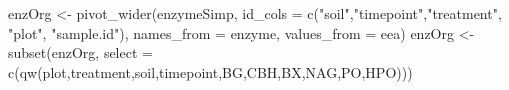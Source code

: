 \documentclass[
]{article}
\newenvironment{Shaded}{\begin{snugshade}}{\end{snugshade}}
\newcommand{\AttributeTok}[1]{\textcolor[rgb]{0.77,0.63,0.00}{#1}}
\newcommand{\FunctionTok}[1]{\textcolor[rgb]{0.00,0.00,0.00}{#1}}
\newcommand{\NormalTok}[1]{#1}
\newcommand{\OtherTok}[1]{\textcolor[rgb]{0.56,0.35,0.01}{#1}}
\newcommand{\SpecialCharTok}[1]{\textcolor[rgb]{0.00,0.00,0.00}{#1}}
\newcommand{\StringTok}[1]{\textcolor[rgb]{0.31,0.60,0.02}{#1}}
\begin{document}
\begin{Shaded}
\end{Shaded}

\begin{Shaded}
\begin{Highlighting}[]
\NormalTok{enzOrg }\OtherTok{\textless{}{-}} \FunctionTok{pivot\_wider}\NormalTok{(enzymeSimp, }\AttributeTok{id\_cols =} \FunctionTok{c}\NormalTok{(}\StringTok{"soil"}\NormalTok{,}\StringTok{"timepoint"}\NormalTok{,}\StringTok{"treatment"}\NormalTok{, }\StringTok{"plot"}\NormalTok{, }\StringTok{"sample.id"}\NormalTok{), }\AttributeTok{names\_from =}\NormalTok{ enzyme, }\AttributeTok{values\_from =}\NormalTok{ eea)}
\NormalTok{enzOrg }\OtherTok{\textless{}{-}} \FunctionTok{subset}\NormalTok{(enzOrg, }\AttributeTok{select =} \FunctionTok{c}\NormalTok{(}\FunctionTok{qw}\NormalTok{(plot,treatment,soil,timepoint,BG,CBH,BX,NAG,PO,HPO)))}
\end{Highlighting}
\end{Shaded}
\end{document}
